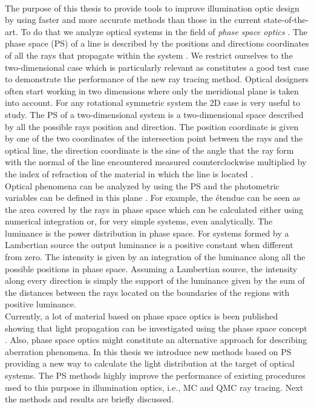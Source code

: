 \\ \indent The purpose of this thesis to provide tools to improve illumination optic design by using faster and more accurate methods than those in the current state-of-the-art.
To do that we analyze optical systems in the field of \textit{phase space optics} \cite{torre2005linear}.
The phase space (PS) of a line is described by the positions and directions coordinates of all the rays that propagate within the system \cite{testorf2009phase}. We restrict ourselves to the two-dimensional case which is particularly relevant as constitutes a good test case to
demonstrate the performance of the new ray tracing method.
Optical designers often start working in two dimensions where only the
meridional plane is taken into account. For any rotational symmetric
system the 2D case is very useful to study. 
The PS of a two-dimensional system is a two-dimensional space described by all the possible rays position and direction. The position coordinate is given by one of the two coordinates of the intersection point between the rays and the optical line, the direction coordinate is the sine of the angle that the ray form with the normal of the line encountered measured counterclockwise multiplied by the index of refraction of the material in which the line is located \cite{wolf2004geometric}. 
\\ \indent Optical phenomena can be analyzed by using the PS and the photometric variables can be defined in this plane \cite{rausch2014illumination}.  
For example, the \'{e}tendue can be seen as the area covered by the rays in phase space which can be calculated either using numerical integration or, for very simple systems, even analytically. The luminance is the power distribution in phase space. For systems formed by a Lambertian source the output luminance is a positive constant when different from zero. The intensity is given by an integration of the luminance along all the possible positions in phase space. Assuming a Lambertian source, the intensity along every direction is simply the support of the luminance given by the sum of the distances between the rays located on the boundaries of the regions with positive luminance. 
\\ \indent Currently, a lot of material based on phase space optics is been published showing that light propagation can be investigated using the phase space concept \cite{rausch2012phase,rausch2014phase, herkommer2012phase}. Also, phase space optics might constitute an alternative approach for describing aberration phenomena\cite{herkommer2013phase, babington2017freeform, wolf1993relativistic}. In this thesis we introduce new methods based on PS providing a new way to calculate the light distribution at the target of optical systems. The PS methods highly improve the performance of existing procedures used to this purpose in illumination optics, i.e., MC and QMC ray tracing. 
Next the methods and results are briefly discussed. 
